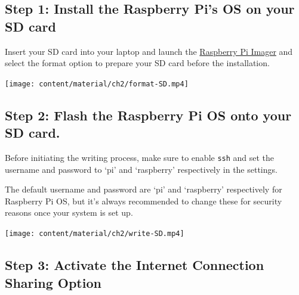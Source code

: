 \documentclass[
  letterpaper,
  DIV=11,
  numbers=noendperiod]{scrreprt}
\begin{document}

\hypertarget{step-1-install-the-raspberry-pis-os-on-your-sd-card}{%
\subsection*{Step 1: Install the Raspberry Pi's OS on your SD
card}\label{step-1-install-the-raspberry-pis-os-on-your-sd-card}}

Insert your SD card into your laptop and launch the
\href{https://www.raspberrypi.com/software/}{Raspberry Pi Imager} and
select the format option to prepare your SD card before the
installation.

\texttt{[image: content/material/ch2/format-SD.mp4]}

\hypertarget{step-2-flash-the-raspberry-pi-os-onto-your-sd-card.}{%
\subsection*{Step 2: Flash the Raspberry Pi OS onto your SD
card.}\label{step-2-flash-the-raspberry-pi-os-onto-your-sd-card.}}

Before initiating the writing process, make sure to enable \texttt{ssh}
and set the username and password to `pi' and `raspberry' respectively
in the settings.

\begin{tcolorbox}[enhanced jigsaw, colbacktitle=quarto-callout-note-color!10!white, left=2mm, titlerule=0mm, toprule=.15mm, opacityback=0, colframe=quarto-callout-note-color-frame, breakable, rightrule=.15mm, colback=white, opacitybacktitle=0.6, bottomtitle=1mm, coltitle=black, toptitle=1mm, title=\textcolor{quarto-callout-note-color}{\faInfo}\hspace{0.5em}{Note}, arc=.35mm, bottomrule=.15mm, leftrule=.75mm]

The default username and password are `pi' and `raspberry' respectively
for Raspberry Pi OS, but it's always recommended to change these for
security reasons once your system is set up.

\end{tcolorbox}

\texttt{[image: content/material/ch2/write-SD.mp4]}

\hypertarget{step-3-activate-the-internet-connection-sharing-option}{%
\subsection*{Step 3: Activate the Internet Connection Sharing
Option}\label{step-3-activate-the-internet-connection-sharing-option}}
\end{document}
